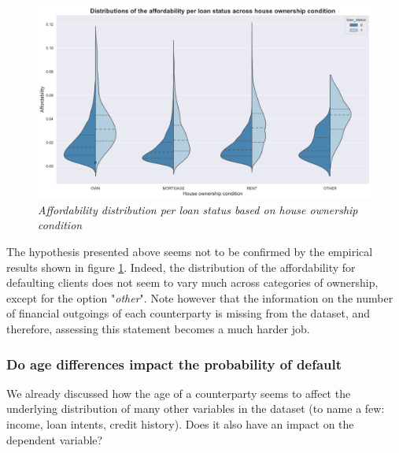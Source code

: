 \documentclass[a4paper,12pt]{article}
\begin{document}
        \begin{figure}[H]
            \centerline{
                \includegraphics[width=\linewidth]{./images/loans_affordability_status_ownership.png}
            }
            \caption{\textit{Affordability distribution per loan status based on house ownership condition}}
            \label{fig:loans_affordability_status_ownership}
        \end{figure}

    The hypothesis presented above seems not to be confirmed by the empirical results shown in figure \ref{fig:loans_affordability_status_ownership}. 
    Indeed,  the distribution of the affordability for defaulting clients does not seem to vary much across categories of 
    ownership, except for the option "\textit{other}". Note however that the information on the number of 
    financial outgoings of each counterparty is missing from the dataset, and therefore, assessing this 
    statement becomes a much harder job.

    \subsubsection{Do age differences impact the probability of default}
    We already discussed how the age of a counterparty seems to affect the underlying distribution of 
    many other variables in the dataset (to name a few: income, loan intents, credit history). 
    Does it also have an impact on the dependent variable?
\end{document}

